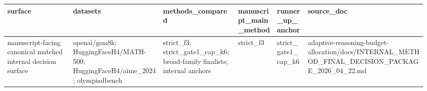 \begin{tabular}{llllll}
\hline
surface & datasets & methods\_compared & manuscript\_main\_method & runner\_up\_anchor & source\_doc \\
\hline
manuscript-facing canonical matched internal decision surface & openai/gsm8k; HuggingFaceH4/MATH-500; HuggingFaceH4/aime\_2024; olympiadbench & strict\_f3; strict\_gate1\_cap\_k6; broad-family finalists; internal anchors & strict\_f3 & strict\_gate1\_cap\_k6 & adaptive-reasoning-budget-allocation/docs/INTERNAL\_METHOD\_FINAL\_DECISION\_PACKAGE\_2026\_04\_22.md \\
\hline
\end{tabular}
